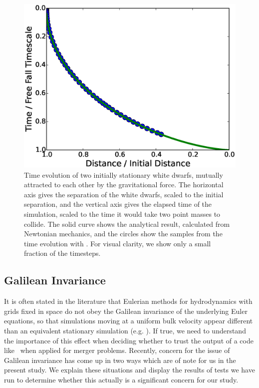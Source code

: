 \documentclass[12pt]{article}
\begin{document}
\begin{figure}[h!]
  \centering
  \includegraphics[scale=0.80,trim=0.3in 0.0in 0.8in 0.45in,clip]{plots/freefall}
  \caption[Gravitational free-fall test]
          {Time evolution of two initially stationary white dwarfs,
           mutually attracted to each other by the gravitational force. The
           horizontal axis gives the separation of the white dwarfs, scaled
           to the initial separation, and the vertical axis gives the elapsed
           time of the simulation, scaled to the time it would take two point masses
           to collide. The solid curve shows the analytical result,
           calculated from Newtonian mechanics, and the circles show the
           samples from the time evolution with \castro. For visual clarity, we
           show only a small fraction of the timesteps.\label{fig:freefall}}
\end{figure}

\subsection{Galilean Invariance}
\label{sec:galileo}

It is often stated in the literature that Eulerian methods for
hydrodynamics with grids fixed in space do not obey the Galilean
invariance of the underlying Euler equations, so that simulations
moving at a uniform bulk velocity appear different than an
equivalent stationary simulation (e.g. \citealt{arepo}). If true, we need to understand
the importance of this effect when deciding whether to trust the
output of a code like \castro\ when applied for merger problems.
Recently, concern for the issue of Galilean invariance has come up in two ways which are of note for us
in the present study. We explain these situations and display
the results of tests we have run to determine whether this
actually is a significant concern for our study.
\end{document}
